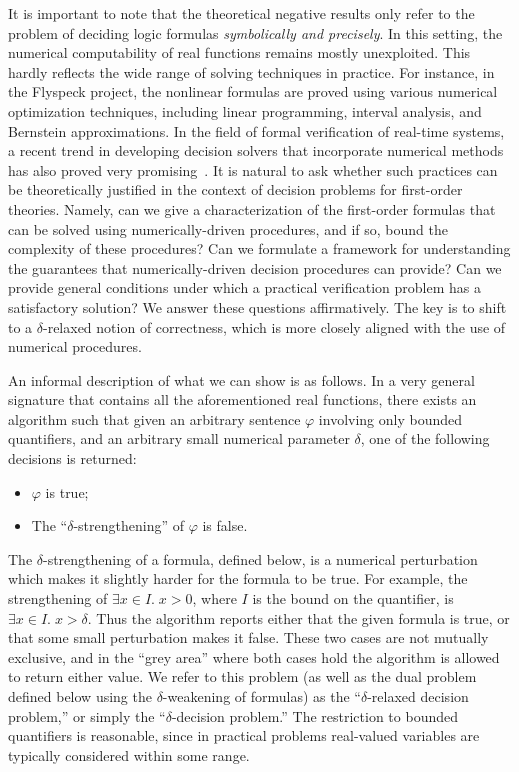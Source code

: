 \documentclass[prodmode]{acmsmall} %
\begin{document}
It is important to note that the theoretical negative results only refer to the problem of deciding logic formulas {\em symbolically and precisely}. In this setting, the numerical computability of real functions remains mostly unexploited. This hardly reflects the wide range of solving techniques in practice. For instance, in the Flyspeck project, the nonlinear formulas are proved using various numerical optimization techniques, including linear programming, interval analysis, and Bernstein approximations. In the field of formal verification of real-time systems, a recent trend in developing decision solvers that incorporate numerical methods has also proved very promising~\cite{HySAT,AkbarpourP09,DBLP:conf/fmcad/Gao10,cordic}. It is natural to ask whether such practices can be theoretically justified in the context of decision problems for first-order theories. Namely, can we give a characterization of the first-order formulas that can be solved using numerically-driven procedures, and if so, bound the complexity of these procedures? Can we formulate a framework for understanding the guarantees that numerically-driven decision procedures can provide? Can we provide general conditions under which a practical verification problem has a satisfactory solution? We answer these questions affirmatively. The key is to shift to a $\delta$-relaxed notion of correctness, which is more closely aligned with the use of numerical procedures. 

An informal description of what we can show is as follows. In a very general signature that contains all the aforementioned real functions, there exists an algorithm such that given an arbitrary sentence $\varphi$ involving only bounded quantifiers, and an arbitrary small numerical parameter $\delta$, one of the following decisions is returned:
\begin{itemize}
\item $\varphi$ is true;
\item The ``$\delta$-strengthening'' of $\varphi$ is false. 
\end{itemize}
The $\delta$-strengthening of a formula, defined below, is a numerical perturbation which makes it slightly harder for the formula to be true. For example, the strengthening of $\exists x\in I. \; x>0$, where $I$ is the bound on the quantifier, is $\exists x\in I. \; x>\delta$. Thus the algorithm reports either that the given formula is true, or that some small perturbation makes it false. These two cases are not mutually exclusive, and in the ``grey area'' where both cases hold the algorithm is allowed to return either value. We refer to this problem (as well as the dual problem defined below using the $\delta$-weakening of formulas) as the ``$\delta$-relaxed decision problem,'' or simply the ``$\delta$-decision problem.'' The restriction to bounded quantifiers is reasonable, since in practical problems real-valued variables are typically considered within some range.  
\end{document}
